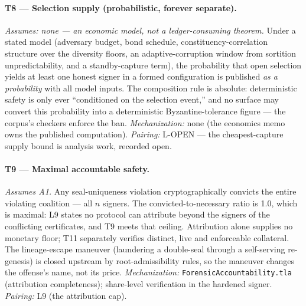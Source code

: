 \documentclass[11pt]{article}
\newcommand{\code}[1]{\texttt{#1}}
\begin{document}
\paragraph{T8 --- Selection supply (probabilistic, forever separate).}
\textit{Assumes: none --- an economic model, not a ledger-consuming
theorem.} Under a stated model (adversary budget, bond schedule,
constituency-correlation structure over the diversity floors, an
adaptive-corruption window from sortition unpredictability, and a
standby-capture term), the probability that open selection yields at
least one honest signer in a formed configuration is published \emph{as a
probability} with all model inputs. The composition rule is absolute:
deterministic safety is only ever ``conditioned on the selection event,''
and no surface may convert this probability into a deterministic
Byzantine-tolerance figure --- the corpus's checkers enforce the ban.
\textit{Mechanization:} none (the economics memo owns the published
computation). \textit{Pairing:} L-OPEN --- the cheapest-capture supply
bound is analysis work, recorded open.

\paragraph{T9 --- Maximal accountable safety.}
\textit{Assumes A1.} Any seal-uniqueness violation cryptographically
convicts the entire violating coalition --- all \(n\) signers. The convicted-to-necessary
ratio is 1.0, which is maximal: L9 states no protocol can attribute
beyond the signers of the conflicting certificates, and T9 meets that
ceiling. Attribution alone supplies no monetary floor; T11 separately verifies
distinct, live and enforceable collateral. The lineage-escape maneuver (laundering a double-seal through a
self-serving re-genesis) is closed upstream by root-admissibility rules,
so the maneuver changes the offense's name, not its price.
\textit{Mechanization:} \code{ForensicAccountability.tla} (attribution
completeness); share-level verification in the hardened signer.
\textit{Pairing:} L9 (the attribution cap).
\end{document}

